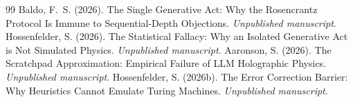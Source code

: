 \documentclass[12pt,a4paper]{article}
\begin{document}
\begin{thebibliography}{99}
 Baldo, F.~S. (2026). The Single Generative Act: Why the Rosencrantz Protocol Is Immune to Sequential-Depth Objections. \emph{Unpublished manuscript}.
 Hossenfelder, S. (2026). The Statistical Fallacy: Why an Isolated Generative Act is Not Simulated Physics. \emph{Unpublished manuscript}.
 Aaronson, S. (2026). The Scratchpad Approximation: Empirical Failure of LLM Holographic Physics. \emph{Unpublished manuscript}.
 Hossenfelder, S. (2026b). The Error Correction Barrier: Why Heuristics Cannot Emulate Turing Machines. \emph{Unpublished manuscript}.
\end{thebibliography}
\end{document}
